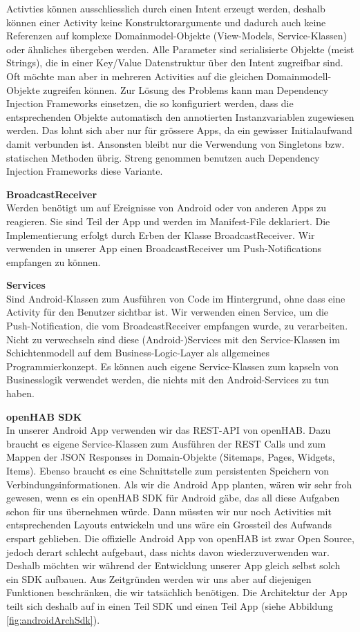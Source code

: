 Activties können ausschliesslich durch einen Intent erzeugt werden, deshalb können einer Activity keine Konstruktorargumente und dadurch auch keine Referenzen auf komplexe Domainmodel-Objekte (View-Models, Service-Klassen) oder ähnliches übergeben werden. Alle Parameter sind serialisierte Objekte (meist Strings), die in einer Key/Value Datenstruktur über den Intent zugreifbar sind. Oft möchte man aber in mehreren Activities auf die gleichen Domainmodell-Objekte zugreifen können. Zur Lösung des Problems kann man Dependency Injection Frameworks einsetzen, die so konfiguriert werden, dass die entsprechenden Objekte automatisch den annotierten Instanzvariablen zugewiesen werden. Das lohnt sich aber nur für grössere Apps, da ein gewisser Initialaufwand damit verbunden ist. Ansonsten bleibt nur die Verwendung von Singletons bzw. statischen Methoden übrig. Streng genommen benutzen auch Dependency Injection Frameworks diese Variante.

\textbf{BroadcastReceiver}\\
Werden benötigt um auf Ereignisse von Android oder von anderen Apps zu reagieren. Sie sind Teil der App und werden im Manifest-File deklariert. Die Implementierung erfolgt durch Erben der Klasse BroadcastReceiver. Wir verwenden in unserer App einen BroadcastReceiver um Push-Notifications empfangen zu können.

\textbf{Services}\\
Sind Android-Klassen zum Ausführen von Code im Hintergrund, ohne dass eine Activity für den Benutzer sichtbar ist. Wir verwenden einen Service, um die Push-Notification, die vom BroadcastReceiver empfangen wurde, zu verarbeiten. Nicht zu verwechseln sind diese (Android-)Services mit den Service-Klassen im Schichtenmodell auf dem Business-Logic-Layer als allgemeines Programmierkonzept. Es können auch eigene Service-Klassen zum kapseln von Businesslogik verwendet werden, die nichts mit den Android-Services zu tun haben.

\textbf{openHAB SDK}\\
In unserer Android App verwenden wir das REST-API von openHAB. Dazu braucht es eigene Service-Klassen zum Ausführen der REST Calls und zum Mappen der JSON Responses in Domain-Objekte (Sitemaps, Pages, Widgets, Items). Ebenso braucht es eine Schnittstelle zum persistenten Speichern von Verbindungsinformationen. Als wir die Android App planten, wären wir sehr froh gewesen, wenn es ein openHAB SDK für Android gäbe, das all diese Aufgaben schon für uns übernehmen würde. Dann müssten wir nur noch Activities mit entsprechenden Layouts entwickeln und uns wäre ein Grossteil des Aufwands erspart geblieben. Die offizielle Android App von openHAB ist zwar Open Source, jedoch derart schlecht aufgebaut, dass nichts davon wiederzuverwenden war. Deshalb möchten wir während der Entwicklung unserer App gleich selbst solch ein SDK aufbauen. Aus Zeitgründen werden wir uns aber auf diejenigen Funktionen beschränken, die wir tatsächlich benötigen. Die Architektur der App teilt sich deshalb auf in einen Teil SDK und einen Teil App (siehe Abbildung \ref{fig:androidArchSdk}). 

